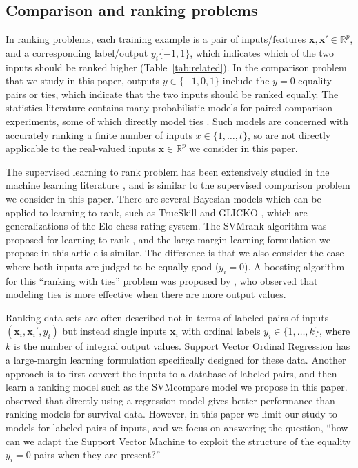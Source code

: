 \documentclass[twoside,11pt]{article}
\newcommand{\changed}[1]{
  #1
}
\newcommand{\RR}{\mathbb R}
\begin{document}
\subsection{Comparison and ranking problems}

In ranking problems, each training example is a pair of
inputs/features $\mathbf x,\mathbf x'\in\RR^p$, and a corresponding
label/output $y_i\{-1,1\}$, which indicates which of the two inputs
should be ranked higher (Table~\ref{tab:related}). In the comparison
problem that we study in this paper, outputs $y\in\{-1,0,1\}$ include
the $y=0$ equality pairs or ties, which indicate that the two inputs
should be ranked equally.  The statistics literature contains many
probabilistic models for paired comparison experiments, some of which
directly model ties \citep{davidson-ties}. Such models are concerned
with accurately ranking a finite number of inputs $x\in\{1,\dots,t\}$,
so are not directly applicable to the real-valued inputs
$\mathbf x\in\RR^p$ we consider in this paper. 

The supervised learning to rank problem has been extensively studied
in the machine learning literature \citep{object-ranking-methods,
  learning-to-rank}, and is similar to the supervised comparison
problem we consider in this paper. There are several Bayesian models
which can be applied to learning to rank, such as TrueSkill
\citep{trueskill} and GLICKO \citep{GLICKO}, which are generalizations
of the Elo chess rating system. The SVMrank algorithm was
proposed for learning to rank \citep{ranksvm}, and the large-margin
learning formulation we propose in this article is similar. The
difference is that we also consider the case where both inputs are
judged to be equally good ($y_i=0$). A boosting algorithm for this
``ranking with ties'' problem was proposed by \citet{rank-with-ties},
who observed that modeling ties is more effective when there are more
output values.

\changed{Ranking data sets are often described not in terms of labeled
  pairs of inputs $(\mathbf x_i, \mathbf x_i', y_i)$ but instead
  single inputs $\mathbf x_i$ with ordinal labels
  $y_i\in\{1,\dots,k\}$, where $k$ is the number of integral output
  values. Support Vector Ordinal Regression \citep{ordinal} has a
  large-margin learning formulation specifically designed for these
  data. Another approach is to first convert the inputs to a database
  of labeled pairs, and then learn a ranking model such as the
  SVMcompare model we propose in this paper. \citet{sv-survival}
  observed that directly using a regression model gives better
  performance than ranking models for survival data. However, in this
  paper we limit our study to models for labeled pairs of inputs, and
  we focus on answering the question, ``how can we adapt the Support
  Vector Machine to exploit the structure of the equality $y_i=0$
  pairs when they are present?''}
\end{document}
